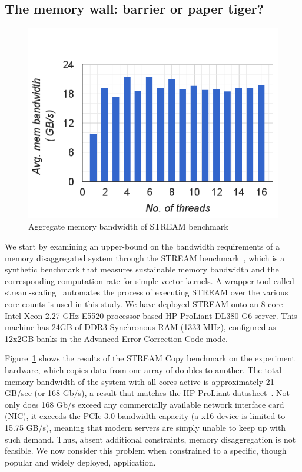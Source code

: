 \documentclass[9pt]{sig-alternate-05-2015}
\begin{document}
\subsection{The memory wall: barrier or paper tiger?}
\label{sec:memory_wall}

\begin{figure}
\centering
\includegraphics[width=\columnwidth]{stream-bandwidth}
\caption{\label{fig:stream}Aggregate memory bandwidth of STREAM benchmark}
\end{figure}

We start by examining an upper-bound on the bandwidth requirements of a memory
disaggregated system through the STREAM benchmark~\cite{mccalpin1995stream},
which is a synthetic benchmark that measures sustainable memory bandwidth and
the corresponding computation rate for simple vector kernels. A wrapper tool
called stream-scaling~\cite{streamScaling} automates the process of executing
STREAM over the various core counts is used in this study.  We have deployed
STREAM onto an 8-core Intel Xeon 2.27 GHz E5520 processor-based HP ProLiant
DL380 G6 server.  This machine has 24GB of DDR3 Synchronous RAM (1333 MHz),
configured as 12x2GB banks in the Advanced Error Correction Code mode.

Figure~\ref{fig:stream} shows the results of the STREAM Copy benchmark on the
experiment hardware, which copies data from one array of doubles to another.
The total memory bandwidth of the system with all cores active is approximately
21 GB/sec (or 168 Gb/s), a result that matches the HP ProLiant
datasheet~\cite{hpProliant}.  Not only does 168 Gb/s exceed any commercially
available network interface card (NIC), it exceeds the PCIe 3.0 bandwidth
capacity (a x16 device is limited to 15.75 GB/s), meaning that modern servers
are simply unable to keep up with such demand.  Thus, absent additional
constraints, memory disaggregation is not feasible.  We now consider this
problem when constrained to a specific, though popular and widely deployed,
application.
\end{document}
